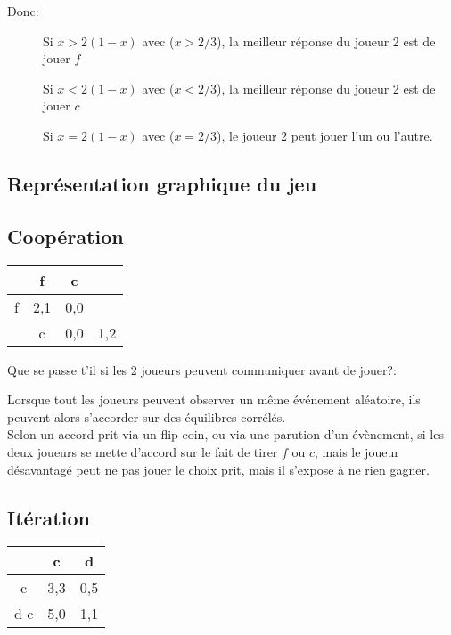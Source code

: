 Donc:
\begin{description}
\item[] Si $x > 2(1-x)$ avec ($x > 2/3$), la meilleur réponse du joueur 2 est de jouer $f$
\item[] Si $x < 2(1-x)$ avec ($x < 2/3$), la meilleur réponse du joueur 2 est de jouer $c$
\item[] Si $x = 2(1-x)$ avec ($x = 2/3$), le joueur 2 peut jouer l'un ou l'autre.
\end{description}


\subsection{Représentation graphique du jeu}

\subsection{Coopération}

\begin{tabular}{c|cc}
$ $ & f & c\\
\hline
f & 2,1 & 0,0\\
& c & 0,0 & 1,2\\
\end{tabular}

Que se passe t'il si les 2 joueurs peuvent communiquer avant de jouer?:

Lorsque tout les joueurs peuvent observer un même événement aléatoire, ils peuvent alors s'accorder sur des équilibres corrélés.\\
Selon un accord prit via un flip coin, ou via une parution d'un évènement, si les deux joueurs se mette d'accord sur le fait de tirer $f$ ou $c$, mais le joueur désavantagé peut ne pas jouer le choix prit, mais il s'expose à ne rien gagner.\\

\subsection{Itération}
\begin{tabular}{c|cc}
$ $ & c & d\\
\hline
c & 3,3 & 0,5\\
d c & 5,0 & 1,1\\
\end{tabular}


\pagebreak